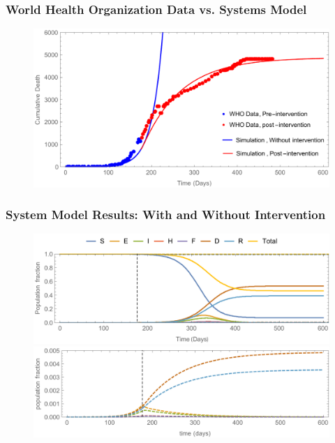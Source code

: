 \documentclass[30pt]{beamer}
\begin{document}
\begin{frame}
\frametitle{World Health Organization Data vs. Systems Model}
\begin{figure}[!h]
  \centering
  \includegraphics[width=1\textwidth]{ValidationPlot.pdf}
 \end{figure}
\end{frame}



\begin{frame}
\frametitle{System Model Results: With and Without Intervention}
\begin{figure}[!h]
  \centering
  \includegraphics[width=1\textwidth]{SEIPlot.pdf}
\label{fig:LB_IM_NoIn} 
 \includegraphics[width=\textwidth]{SEIPlotIntRescale.pdf}  \label{fig:LB_IM_In2} %
\label{fig:LB_IM_In} 
\end{figure}
\end{frame}
\end{document}
